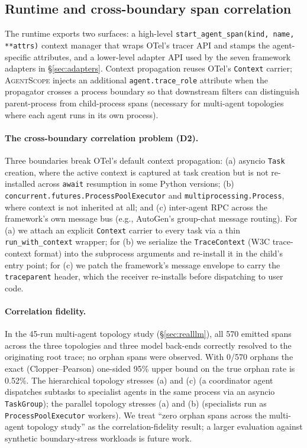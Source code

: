 \documentclass[sigplan,10pt,anonymous,review]{acmart}
\newcommand{\sysname}{\textsc{AgentScope}\xspace}
\begin{document}
\subsection{Runtime and cross-boundary span correlation}
\label{sec:arch:runtime}

The runtime exports two surfaces: a high-level
\texttt{start\_agent\_span(kind, name, **attrs)} context manager that
wraps OTel's tracer API and stamps the agent-specific attributes, and a
lower-level adapter API used by the seven framework adapters in
\S\ref{sec:adapters}. Context propagation reuses OTel's
\texttt{Context} carrier; \sysname injects an additional
\texttt{agent.trace\_role} attribute when the propagator crosses a
process boundary so that downstream filters can distinguish
parent-process from child-process spans (necessary for
multi-agent topologies where each agent runs in its own process).

\paragraph{The cross-boundary correlation problem (D2).}
Three boundaries break OTel's default context propagation: (a) asyncio
\texttt{Task} creation, where the active context is captured at task
creation but is not re-installed across \texttt{await} resumption in
some Python versions; (b) \texttt{concurrent.futures.ProcessPoolExecutor}
and \texttt{multiprocessing.Process}, where context is not inherited at
all; and (c) inter-agent RPC across the framework's own message bus
(e.g., AutoGen's group-chat message routing). For (a) we attach an
explicit \texttt{Context} carrier to every task via a thin
\texttt{run\_with\_context} wrapper; for (b) we serialize the
\texttt{TraceContext} (W3C trace-context format) into the subprocess
arguments and re-install it in the child's entry point; for (c) we
patch the framework's message envelope to carry the
\texttt{traceparent} header, which the receiver re-installs before
dispatching to user code.

\paragraph{Correlation fidelity.} In the 45-run multi-agent topology
study (\S\ref{sec:realllm}), all 570 emitted spans across the three
topologies and three model back-ends correctly resolved to the
originating root trace; no orphan spans were observed. With 0/570
orphans the exact (Clopper--Pearson) one-sided 95\% upper bound on
the true orphan rate is 0.52\%. The hierarchical topology stresses
(a) and (c) (a coordinator agent dispatches subtasks to specialist
agents in the same process via an asyncio \texttt{TaskGroup}); the
parallel topology stresses (a) and (b) (specialists run as
\texttt{ProcessPoolExecutor} workers). We treat ``zero orphan spans
across the multi-agent topology study'' as the correlation-fidelity
result; a larger evaluation against synthetic boundary-stress
workloads is future work.
\end{document}
